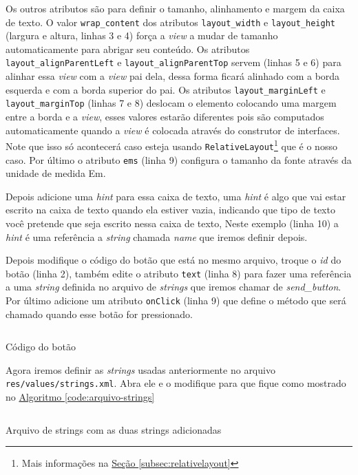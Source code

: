 \documentclass[a4paper,12pt,brazil,oneside]{book}
\begin{document}
Os outros atributos são para definir o tamanho, alinhamento e margem da caixa de texto. O valor \texttt{wrap\_content} dos atributos \texttt{layout\_width} e \texttt{layout\_height} (largura e altura, linhas 3 e 4) força a \emph{view} a mudar de tamanho automaticamente para abrigar seu conteúdo. Os atributos \texttt{layout\_alignParentLeft} e \texttt{layout\_alignParentTop} servem (linhas 5 e 6) para alinhar essa \emph{view} com a \emph{view} pai dela, dessa forma ficará alinhado com a borda esquerda e com a borda superior do pai. Os atributos \texttt{layout\_marginLeft} e \texttt{layout\_marginTop} (linhas 7 e 8) deslocam o elemento colocando uma margem entre a borda e a \emph{view}, esses valores estarão diferentes pois são computados automaticamente quando a \emph{view} é colocada através do construtor de interfaces. Note que isso só acontecerá caso esteja usando \texttt{RelativeLayout}\footnote{Mais informações na \hyperref[subsec:relativelayout]{Seção \ref*{subsec:relativelayout}}} que é o nosso caso. Por último o atributo \texttt{ems} (linha 9) configura o tamanho da fonte através da unidade de medida Em.

Depois adicione uma \textit{hint} para essa caixa de texto, uma \textit{hint} é algo que vai estar escrito na caixa de texto quando ela estiver vazia, indicando que tipo de texto você pretende que seja escrito nessa caixa de texto, Neste exemplo (linha 10) a \textit{hint} é uma referência a \emph{string} chamada \emph{name} que iremos definir depois.

Depois modifique o código do botão que está no mesmo arquivo, troque o \emph{id} do botão (linha 2), também edite o atributo \texttt{text} (linha 8) para fazer uma referência a uma \emph{string} definida no arquivo de \emph{strings} que iremos chamar de \emph{send\_button}. Por último adicione um atributo \texttt{onClick} (linha 9) que define o método que será chamado quando esse botão for pressionado.

\begin{listing}[H]
\inputminted[linenos=true,fontsize=\small,frame=lines, framesep=2mm, tabsize=2,numbersep=5pt]{xml}{src/firstapp/2.xml}
\caption{Código do botão}
\end{listing}

Agora iremos definir as \emph{strings} usadas anteriormente no arquivo \texttt{res/values/strings.xml}. Abra ele e o modifique para que fique como mostrado no 
\hyperref[code:arquivo-strings]{Algoritmo \ref*{code:arquivo-strings}}

\begin{listing}
\inputminted[linenos=true,fontsize=\small,frame=lines, framesep=2mm, tabsize=2,numbersep=5pt]{xml}{src/firstapp/3.xml}
\caption{Arquivo de strings com as duas strings adicionadas}
\label{code:arquivo-strings}
\end{listing}
\end{document}
